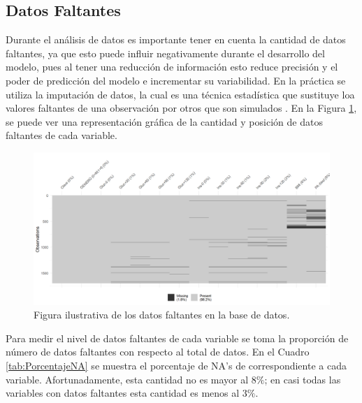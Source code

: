 
\subsection{Datos Faltantes}

Durante el análisis de datos es importante tener en cuenta la cantidad de datos faltantes, ya que esto puede influir negativamente durante el desarrollo del modelo, pues al tener una reducción de información esto reduce precisión y el poder de predicción del modelo e incrementar su variabilidad. En la práctica se utiliza la imputación de datos, la cual es una técnica estadística que sustituye loa valores faltantes de una observación por otros que son simulados \cite{Imputacion}. En la Figura \ref{fig:Nas}, se puede ver una representación gráfica de la cantidad y posición de datos faltantes de cada variable.

\begin{figure}[H]
    \centering
    \includegraphics[width = 0.8 \textwidth, height = 6 cm]{Imagenes/datosFaltantes.png}
    \caption{Figura ilustrativa de los datos faltantes en la base de datos.}
    \label{fig:Nas}
\end{figure}

Para medir el nivel de datos faltantes de cada variable se toma la proporción de número de datos faltantes con respecto al total de datos. En el Cuadro \ref{tab:PorcentajeNA} se muestra el porcentaje de NA's de correspondiente a cada variable. Afortunadamente, esta cantidad no es mayor al $8 \%$; en casi todas las variables con datos faltantes esta cantidad es menos al $3\%$. 


